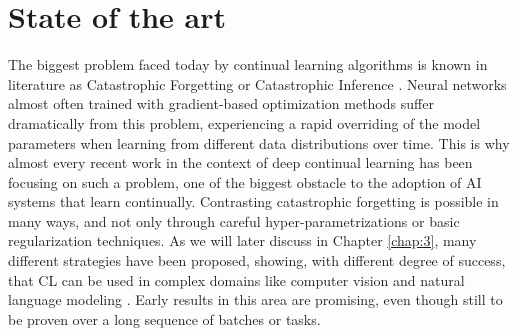 \documentclass[english, LaM, oneside]{sapthesis}%
\begin{document}
\section{State of the art}

The biggest problem faced today by continual learning algorithms is known in literature as Catastrophic Forgetting or Catastrophic Inference \cite{cat_forgetting}. Neural networks almost often trained with gradient-based optimization methods suffer dramatically from this problem, experiencing a rapid overriding of the model parameters when learning from different data distributions over time. This is why almost every recent work in the context of deep continual learning has been focusing on such a problem, one of the biggest obstacle to the adoption of AI systems that learn continually.
Contrasting catastrophic forgetting is possible in many ways, and not only through careful hyper-parametrizations or basic regularization techniques. As we will later discuss in Chapter \ref{chap:3}, many different strategies have been proposed, showing, with different degree of success, that CL can be used in complex domains like computer vision and natural language modeling \cite{parisi}. Early results in this area are promising, even though still to be proven over a long sequence of batches or tasks.
\end{document}
